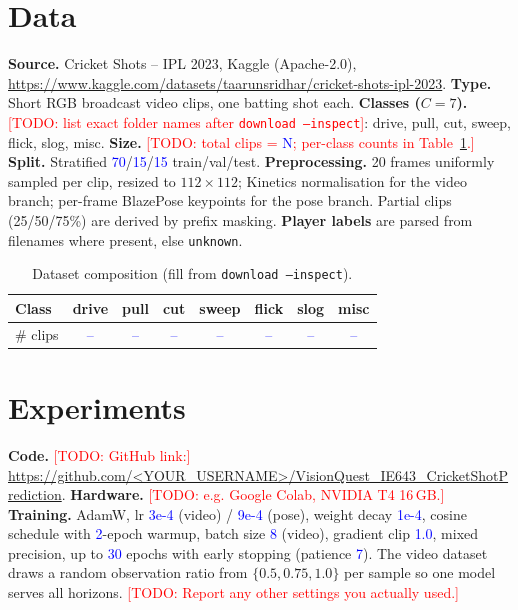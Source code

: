 \documentclass[11pt]{article}
\newcommand{\TODO}[1]{\textcolor{red}{[TODO: #1]}}
\newcommand{\NUM}[1]{\textcolor{blue}{#1}}   %
\begin{document}
\section{Data}
\textbf{Source.} Cricket Shots -- IPL 2023, Kaggle (Apache-2.0),
\url{https://www.kaggle.com/datasets/taarunsridhar/cricket-shots-ipl-2023}.
\textbf{Type.} Short RGB broadcast video clips, one batting shot each.
\textbf{Classes ($C=7$).} \TODO{list exact folder names after \texttt{download --inspect}}:
drive, pull, cut, sweep, flick, slog, misc.
\textbf{Size.} \TODO{total clips = \NUM{N}; per-class counts in Table~\ref{tab:data}.}
\textbf{Split.} Stratified \NUM{70}/\NUM{15}/\NUM{15} train/val/test.
\textbf{Preprocessing.} 20 frames uniformly sampled per clip, resized to
$112\times112$; Kinetics normalisation for the video branch; per-frame BlazePose
keypoints for the pose branch. Partial clips (25/50/75\%) are derived by prefix
masking. \textbf{Player labels} are parsed from filenames where present,
else \texttt{unknown}.

\begin{table}[h]\centering
\caption{Dataset composition (fill from \texttt{download --inspect}).}
\label{tab:data}
\begin{tabular}{lccccccc}
\toprule
Class & drive & pull & cut & sweep & flick & slog & misc \\
\midrule
\# clips & \NUM{--} & \NUM{--} & \NUM{--} & \NUM{--} & \NUM{--} & \NUM{--} & \NUM{--} \\
\bottomrule
\end{tabular}
\end{table}

\section{Experiments}
\textbf{Code.} \TODO{GitHub link:} \url{https://github.com/<YOUR_USERNAME>/VisionQuest_IE643_CricketShotPrediction}.
\textbf{Hardware.} \TODO{e.g. Google Colab, NVIDIA T4 16\,GB.}
\textbf{Training.} AdamW, lr \NUM{3e-4} (video) / \NUM{9e-4} (pose), weight decay
\NUM{1e-4}, cosine schedule with \NUM{2}-epoch warmup, batch size \NUM{8}
(video), gradient clip \NUM{1.0}, mixed precision, up to \NUM{30} epochs with
early stopping (patience \NUM{7}). The video dataset draws a random observation
ratio from $\{0.5,0.75,1.0\}$ per sample so one model serves all horizons.
\TODO{Report any other settings you actually used.}
\end{document}

